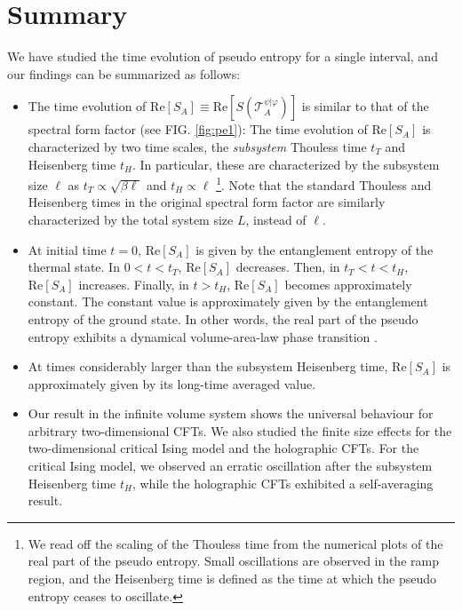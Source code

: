 \documentclass[%
twocolumn, 
secnumarabic,amssymb, preprintnumbers, superscriptaddress, aps, prl]{revtex4-1}
\begin{document}
\section*{Summary}
We have studied the time evolution of pseudo entropy for a single interval, and our findings can be summarized as follows: 
\begin{itemize}
\item The time evolution of  $\text{Re}[S_A]\equiv\text{Re}[S(\mathcal{T}^{\psi|\varphi}_A)]$ is similar to that of the spectral form factor (see FIG. \ref{fig:pe1}): The time evolution of $\text{Re}[S_A]$ is characterized by two time scales, the {\it subsystem} Thouless time $t_T$ and Heisenberg time $t_H$. In particular, these are characterized by the subsystem size $\ell$ as $t_T\propto\sqrt{\beta\ell}$ and $t_H\propto\ell$ \footnote{We read off the scaling of the Thouless time from the numerical plots of the real part of the pseudo entropy. Small oscillations are observed in the ramp region, and the Heisenberg time is defined as the time at which the pseudo entropy ceases to oscillate.}. Note that the standard Thouless and Heisenberg times in the original spectral form factor are similarly characterized by the total system size $L$, instead of $\ell$.
\item At initial time $t=0$, $\text{Re}[S_A]$ is given by the entanglement entropy of the thermal state. In $0<t<t_T$,  $\text{Re}[S_A]$ decreases. Then, in $t_T<t<t_H$,  $\text{Re}[S_A]$ increases. Finally, in $t>t_H$, $\text{Re}[S_A]$ becomes approximately  constant. The constant value is approximately given by the entanglement entropy of the ground state. In other words, the real part of the pseudo entropy exhibits a dynamical volume-area-law phase transition \cite{Chan:2018upn,Li:2018mcv,Skinner:2018tjl}. 
\item At times   %
 considerably larger than the subsystem Heisenberg time, $\text{Re}\left[S_A\right]$ is approximately given by its long-time averaged value. 
\item Our result in the infinite volume system shows the universal behaviour for arbitrary two-dimensional CFTs. We also studied the finite size effects for the two-dimensional critical Ising model and the holographic CFTs. For the critical Ising model, we observed an erratic oscillation after the subsystem Heisenberg time $t_H$, while the holographic CFTs exhibited a self-averaging result.  
\end{itemize}
\end{document}
